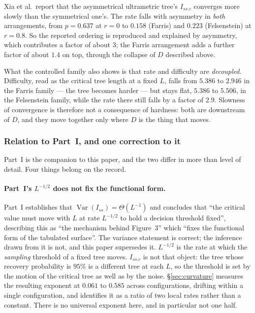\documentclass[preprint,12pt,authoryear]{elsarticle}
\newcommand{\Iss}{I_{ss}}
\newcommand{\Issc}{I_{ss.c}}
\newcommand{\Var}{\operatorname{Var}}
\theoremstyle{definition}
\theoremstyle{remark}
\begin{document}
Xia et al.\ report that the asymmetrical ultrametric tree's $\Issc$ converges
more slowly than the symmetrical one's. The rate falls with asymmetry in
\emph{both} arrangements, from $p=0.637$ at $r=0$ to $0.158$ (Farris) and
$0.223$ (Felsenstein) at $r=0.8$. So the reported ordering is reproduced and
explained by asymmetry, which contributes a factor of about $3$; the Farris
arrangement adds a further factor of about $1.4$ on top, through the collapse
of $D$ described above.

What the controlled family also shows is that rate and difficulty are
\emph{decoupled}. Difficulty, read as the critical tree length at a fixed
$L$, falls from $5.386$ to $2.946$ in the Farris family --- the tree becomes
harder --- but stays flat, $5.386$ to $5.506$, in the Felsenstein family,
while the rate there still falls by a factor of $2.9$. Slowness of
convergence is therefore not a consequence of hardness: both are downstream
of $D$, and they move together only where $D$ is the thing that
moves.

\subsubsection{Relation to Part~I, and one correction to it}
\label{sec:part1}

Part~I \citep{xu2026preprint} is the companion to this paper, and the two
differ in more than level of detail. Four things belong on the record.

\paragraph{Part~I's $L^{-1/2}$ does not fix the functional form.} Part~I
establishes that $\Var(\Iss)=\Theta(L^{-1})$ and concludes that ``the critical
value must move with $L$ at rate $L^{-1/2}$ to hold a decision threshold
fixed'', describing this as ``the mechanism behind Figure~3'' which ``fixes
the functional form of the tabulated surface''. The variance statement is
correct; the inference drawn from it is not, and this paper supersedes it.
$L^{-1/2}$ is the rate at which the \emph{sampling} threshold of a fixed tree
moves. $\Issc$ is not that object: the tree whose recovery probability is
$95\%$ is a different tree at each $L$, so the threshold is set by the motion
of the critical tree as well as by the noise. \S\ref{sec:curvature} measures
the resulting exponent at $0.061$ to $0.585$ across configurations, drifting
within a single configuration, and identifies it as a ratio of two local
rates rather than a constant. There is no universal exponent here, and in
particular not one half.
\end{document}
